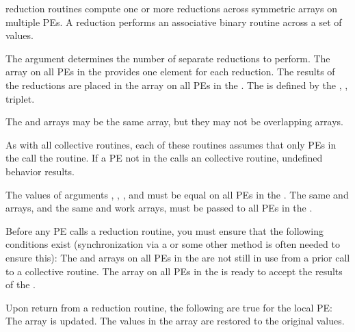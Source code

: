  {  
 \openshmem reduction routines compute one or more
 reductions across symmetric arrays on multiple \acp{PE}.  A
 reduction performs an associative binary routine across a set of
 values.	 
 
  The  argument determines the number of separate reductions to
 perform.  The \source{} array on all \ac{PE}s in the \activeset{} provides one
 element for each reduction.  The results of the reductions are placed
 in the \dest{} array on all \ac{PE}s in the \activeset.  The \activeset{} is
 defined by the , ,  triplet.

 The \source{} and \dest{} arrays may be the same array, but they may not be
 overlapping arrays.

 As with all \openshmem{} collective routines, each of these routines assumes
 that only \ac{PE}s in the \activeset{} call the routine.  If a \ac{PE} not in the
 \activeset{} calls an \openshmem collective routine, undefined behavior
 results.

The values of arguments , , , and  must be equal on all \ac{PE}s in the \activeset. The same \dest{} and \source{} arrays, and the same  and  work arrays, must be passed to all \ac{PE}s in the \activeset.

 Before any \ac{PE} calls a reduction routine, you must ensure that the
 following conditions exist (synchronization via a  or some other
 method is often needed to ensure this): The  and  arrays on
 all \ac{PE}s in the \activeset{} are not still in use from a prior call to a
 collective \openshmem{} routine.  The \dest{} array on all \ac{PE}s in the \activeset{} 
 is ready to accept the results of the .

 Upon return from a reduction routine, the following are true for the
 local \ac{PE}: The \dest{} array is updated.  The values in the  array
 are restored to the original values.
}
